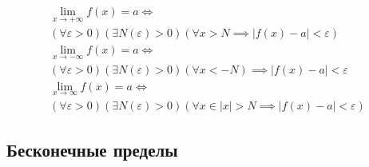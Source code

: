 \begin{note}
 \begin{gather*}
  \lim_{x \to +\infty} f(x) = a \iff \\
  (\forall \varepsilon > 0)(\exists N(\varepsilon) > 0)(\forall x > N \implies |f(x) - a| < \varepsilon) \\
  \lim_{x \to -\infty} f(x) = a \iff \\
  (\forall \varepsilon > 0)(\exists N(\varepsilon) > 0)(\forall x < -N) \implies |f(x) - a| < \varepsilon \\
  \lim_{x \to \infty} f(x) = a \iff \\
  (\forall \varepsilon > 0)(\exists N(\varepsilon) > 0)(\forall x \in |x| > N \implies |f(x) - a| < \varepsilon)
\end{gather*} 
\end{note}

\subsection{Бесконечные пределы}

